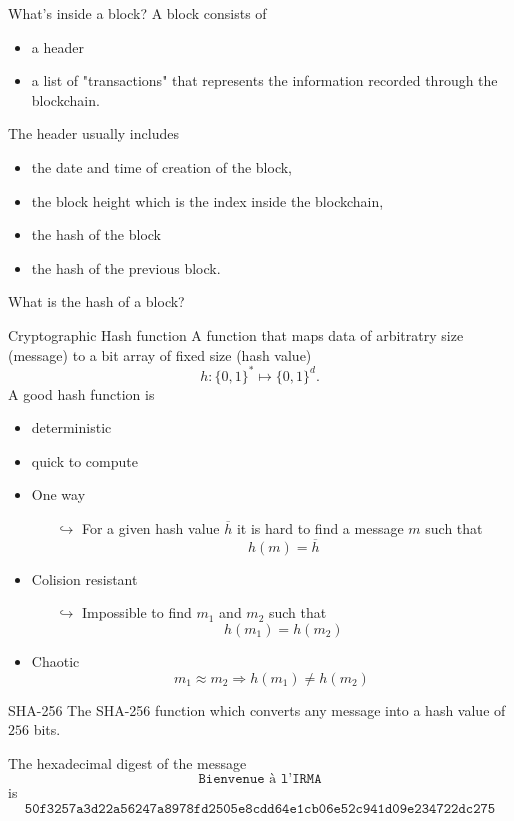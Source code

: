 \documentclass{beamer}
\begin{document}
\appendix
\begin{frame}{What's inside a block?}
A block consists of 
\begin{itemize}
\item a header 
\item a list of "transactions" that represents the information recorded through the blockchain. 
\end{itemize}
The header usually includes 
\begin{itemize}
\item the date and time of creation of the block, 
\item the block height which is the index inside the blockchain, 
\item the hash of the block 
\item the hash of the previous block. 
\end{itemize}
\begin{tcolorbox}[enhanced,drop shadow, title=Question]
What is the hash of a block?
\end{tcolorbox}
\end{frame}
\begin{frame}{Cryptographic Hash function}
\small
A function that maps data of arbitratry size (message) to a bit array of fixed size (hash value)
$$
h:\{0,1\}^\ast\mapsto \{0,1\}^d. 
$$
A good hash function is
\begin{itemize}
\item deterministic
\item quick to compute
\item One way
\begin{itemize}
  \scriptsize
\item[$\hookrightarrow$] For a given hash value $\overline{h}$ it is hard to find a message $m$ such that 
$$
h(m) = \overline{h}
$$
\end{itemize}
\item Colision resistant 
\begin{itemize}
\item[$\hookrightarrow$] Impossible to find $m_1$ and $m_2$ such that 
$$
h(m_1) = h(m_2)
$$
\end{itemize}
\item Chaotic
$$m_1\approx m_2\Rightarrow  h(m_1) \neq h(m_2)$$
\end{itemize}
\end{frame}
\begin{frame}{SHA-256}
The SHA-256 function which converts any message into a hash value of $256$ bits.
\begin{tcolorbox}[enhanced,drop shadow, title=Example]
The hexadecimal digest of the message
$$
\texttt{Bienvenue à l'IRMA}
$$
is 
\footnotesize
$$
\texttt{50f3257a3d22a56247a8978fd2505e8cdd64e1cb06e52c941d09e234722dc275}
$$
\end{tcolorbox}
\end{frame}
\end{document}

